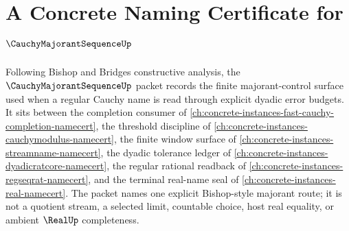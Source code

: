 \chapter{A Concrete Naming Certificate for $\CauchyMajorantSequenceUp$}
\label{ch:concrete-instances-cauchy-majorant-sequence-namecert}

Following Bishop and Bridges constructive analysis, the $\CauchyMajorantSequenceUp$ packet records the finite majorant-control surface used when a regular Cauchy name is read through explicit dyadic error budgets. It sits between the completion consumer of \autoref{ch:concrete-instances-fast-cauchy-completion-namecert}, the threshold discipline of \autoref{ch:concrete-instances-cauchymodulus-namecert}, the finite window surface of \autoref{ch:concrete-instances-streamname-namecert}, the dyadic tolerance ledger of \autoref{ch:concrete-instances-dyadicratcore-namecert}, the regular rational readback of \autoref{ch:concrete-instances-regseqrat-namecert}, and the terminal real-name seal of \autoref{ch:concrete-instances-real-namecert}. The packet names one explicit Bishop-style majorant route; it is not a quotient stream, a selected limit, countable choice, host real equality, or ambient $\RealUp$ completeness.

